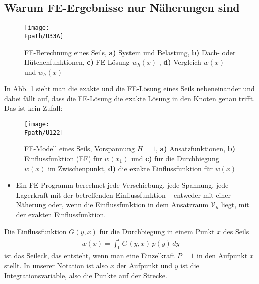 {\textcolor{sectionTitleBlue}{\section{Warum FE-Ergebnisse nur N\"{a}herungen sind}}}
\begin{figure}[tbp] \centering
\centering
\if {} \sidecaption[t] \fi
\texttt{[image: \\Fpath/U33A]}
\caption{FE-Berechnung eines Seils, \textbf{a)} System und Belastung, \textbf{ b)} Dach- oder H\"{u}tchenfunktionen, \textbf{ c)} FE-L\"{o}sung $w_h(x)$ ,
\textbf{ d)} Vergleich $w(x)$ und $w_h(x)$} \label{U33}
\end{figure}%

In Abb. \ref{U33} sieht man die exakte und die FE-L\"{o}sung eines Seils nebeneinander und dabei f\"{a}llt auf, dass die FE-L\"{o}sung die exakte L\"{o}sung in den Knoten genau trifft. Das ist kein Zufall:\\

\begin{figure}[tbp] \centering
\centering
\if {} \sidecaption[t] \fi
\texttt{[image: \\Fpath/U122]}
\caption{FE-Modell eines Seils, Vorspannung $H = 1$, \textbf{a)} Ansatzfunktionen, \textbf{ b)} Einflussfunktion (EF) f\"{u}r $w(x_1)$ und \textbf{ c)} f\"{u}r die Durchbiegung $w(x)$ im Zwischenpunkt, \textbf{ d)} die exakte Einflussfunktion f\"{u}r $w(x)$} \label{U122}
\end{figure}%

\begin{itemize}
  \item Ein FE-Programm berechnet jede Verschiebung, jede Spannung, jede Lagerkraft mit der betreffenden Einflussfunktion -- entweder mit einer N\"{a}herung oder, wenn die Einflussfunktion in  dem Ansatzraum $\mathcal{V}_h $ liegt, mit der exakten Einflussfunktion.
\end{itemize}
Die Einflussfunktion $G(y,x)$ f\"{u}r die Durchbiegung in einem Punkt $x$ des Seils
\begin{align}\label{Eq9}
w(x) = \int_{0}^{l} G(y,x)\,p(y)\,dy
\end{align}
ist das Seileck, das entsteht, wenn man eine Einzelkraft $P = 1 $ in den Aufpunkt $x$ stellt. In unserer Notation ist also $x$ der Aufpunkt und $y$ ist die Integrationsvariable, also die Punkte \glq auf der Strecke\grq.

